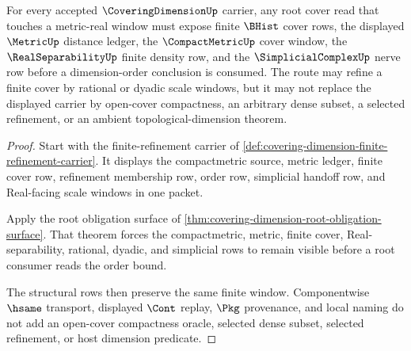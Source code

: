 \begin{theorem}
\label{thm:coveringdimension-root-metric-real-window}
For every accepted $\CoveringDimensionUp$ carrier, any root cover read that touches a metric-real window must expose finite $\BHist$ cover rows, the displayed $\MetricUp$ distance ledger, the $\CompactMetricUp$ cover window, the $\RealSeparabilityUp$ finite density row, and the $\SimplicialComplexUp$ nerve row before a dimension-order conclusion is consumed. The route may refine a finite cover by rational or dyadic scale windows, but it may not replace the displayed carrier by open-cover compactness, an arbitrary dense subset, a selected refinement, or an ambient topological-dimension theorem.
\end{theorem}
\begin{proof}
Start with the finite-refinement carrier of \autoref{def:covering-dimension-finite-refinement-carrier}. It displays the compactmetric source, metric ledger, finite cover row, refinement membership row, order row, simplicial handoff row, and Real-facing scale windows in one packet.

Apply the root obligation surface of \autoref{thm:covering-dimension-root-obligation-surface}. That theorem forces the compactmetric, metric, finite cover, Real-separability, rational, dyadic, and simplicial rows to remain visible before a root consumer reads the order bound.

The structural rows then preserve the same finite window. Componentwise $\hsame$ transport, displayed $\Cont$ replay, $\Pkg$ provenance, and local naming do not add an open-cover compactness oracle, selected dense subset, selected refinement, or host dimension predicate.
\end{proof}

